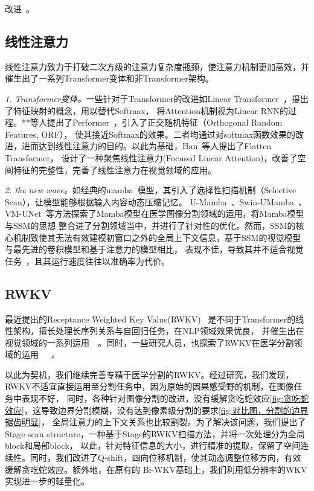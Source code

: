 \documentclass[conference]{IEEEtran}   %
\begin{document}
改进~\cite{Medical Image Segmentation: A Comprehensive Review of Deep Learning Methods}。


\subsection{线性注意力}
线性注意力致力于打破二次方级的注意力复杂度瓶颈，使注意力机制更加高效，并催生出了一系列Transformer变体和非Transformer架构。

\textit{1. Transformer变体。}一些针对于Transformer的改进如Linear Transformer~\cite{lineartransformer}，提出了特征映射的概念，用以替代Softmax，
将Attention机制视为Linear RNN的过程。**等人提出了Performer~\cite{performer}，引入了正交随机特征（Orthogonal Random Features, ORF），
使其接近Softmax的效果。二者均通过对softmax函数效果的改进，进而达到线性注意力的目的。以此为基础，Han~\cite{flatten transformer}等人提出了Flatten Transformer，
设计了一种聚焦线性注意力(Focused Linear Attention)，改善了空间特征的完整性，完善了线性注意力在视觉领域的应用。

\textit{2. the new wave。}如经典的mamba~\cite{mamba}模型，其引入了选择性扫描机制（Selective Scan），让模型能够根据输入内容动态压缩记忆。
U-Mamba~\cite{umamba}、Swin-UMamba~\cite{swinumamba}、VM-UNet~\cite{vmunet}等方法探索了Mamba模型在医学图像分割领域的运用，将Mamba模型与SSM的思想
整合进了分割领域当中，并进行了针对性的优化。然而，SSM的核心机制致使其无法有效建模初窗口之外的全局上下文信息，基于SSM的视觉模型与最先进的卷积模型和基于注意力的模型相比，
表现不佳，导致其并不适合视觉任务~\cite{mamba out}，且其运行速度往往以准确率为代价。

\subsection{RWKV}
最近提出的Receptance Weighted Key Value(RWKV) ~\cite{RWKV}是不同于Transformer的线性架构，擅长处理长序列关系与自回归任务，在NLP领域效果优良，
并催生出在视觉领域的一系列运用~\cite{vrwkv}~\cite{RSRWKV}。同时，一些研究人员，也探索了RWKV在医学分割领域的运用~\cite{urwkv}~\cite{rwkv unet}~\cite{zigrir}。

以此为契机，我们继续完善专精于医学分割的RWKV。经过研究，我们发现，RWKV不适宜直接运用至分割任务中，因为原始的因果感受野的机制，在图像任务中表现不好，
同时，各种针对图像分割的改进，没有缓解贪吃蛇效应\ref{fig:贪吃蛇效应}，这导致边界分割模糊，没有达到像素级分割的要求\ref{fig:对比图，分割的边界锯齿明显}，
全局注意力的上下文关系也比较割裂。为了解决该问题，我们提出了Stage scan structure，一种基于Stage的RWKV扫描方法，并将一次处理分为全局block和局部block，
以此，针对特征信息的大小，进行精准的提取，保留了空间连续性。同时，我们改进了Q-shift，四向位移机制，使其动态调整位移方向，有效缓解贪吃蛇效应。额外地，在原有的
Bi-WKV基础上，我们利用低分辨率的WKV实现进一步的轻量化。
\end{document}
